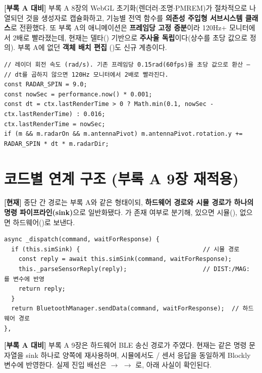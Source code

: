 \smallskip
\noindent\textbf{[부록 A 대비]} 부록 A 8장의 WebGL 초기화(렌더러$\cdot$조명$\cdot$PMREM)가 절차적으로
나열되던 것을  생성자로 캡슐화하고, 기능별 전역 함수를 \textbf{의존성 주입형
서브시스템 클래스}로 전환했다. 또 부록 A의 애니메이션은 \textbf{프레임당 고정 증분}이라
120Hz+ 모니터에서 2배로 빨라졌는데, 현재는  델타() 기반으로
\textbf{주사율 독립}이다(상수를 초당 값으로 정의). 부록 A에 없던 \textbf{객체 배치 편집}
()도 신규 계층이다.

\begin{verbatim}
// 레이더 회전 속도 (rad/s). 기존 프레임당 0.15rad(60fps)을 초당 값으로 환산 —
// dt를 곱하지 않으면 120Hz 모니터에서 2배로 빨라진다.
const RADAR_SPIN = 9.0;
const nowSec = performance.now() * 0.001;
const dt = ctx.lastRenderTime > 0 ? Math.min(0.1, nowSec - ctx.lastRenderTime) : 0.016;
ctx.lastRenderTime = nowSec;
if (m && m.radarOn && m.antennaPivot) m.antennaPivot.rotation.y += RADAR_SPIN * dt * m.radarDir;
\end{verbatim}

\section{코드별 연계 구조 (부록 A 9장 재적용)}
\textbf{[현재]} 종단 간 경로는 부록 A와 같은 형태이되, \textbf{하드웨어 경로와 시뮬 경로가 하나의
명령 파이프라인(sink)}으로 일반화됐다. 가 
존재 여부로 분기해, 있으면 시뮬(), 없으면 하드웨어()로 보낸다.

\begin{verbatim}
async _dispatch(command, waitForResponse) {
  if (this.simSink) {                                  // 시뮬 경로
    const reply = await this.simSink(command, waitForResponse);
    this._parseSensorReply(reply);                     // DIST:/MAG: 를 변수에 반영
    return reply;
  }
  return BluetoothManager.sendData(command, waitForResponse);  // 하드웨어 경로
},
\end{verbatim}

\smallskip
\noindent\textbf{[부록 A 대비]} 부록 A 9장은 하드웨어 BLE 송신 경로가 주였다. 현재는 같은 명령
문자열을 sink 하나로 양쪽에 재사용하며, 시뮬에서도 / 센서 응답을 동일하게
Blockly 변수에 반영한다. 실제 진입 배선은  $\to$  $\to$
로, 아래 사실이 확인된다.

